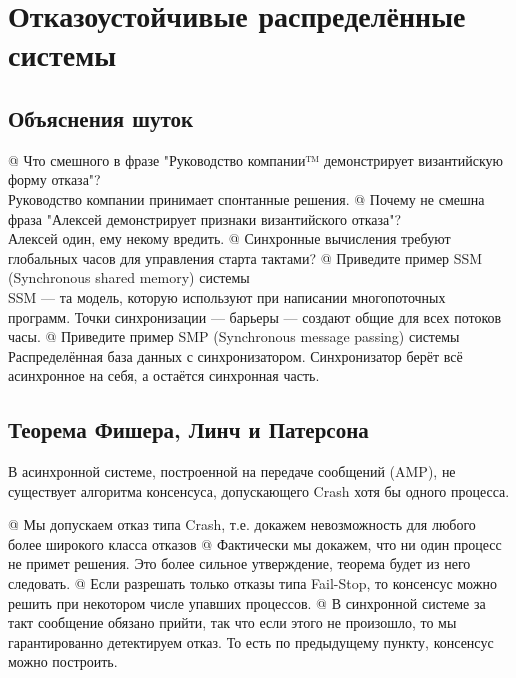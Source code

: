 \section{Отказоустойчивые распределённые системы}

\subsection{Объяснения шуток}
\begin{el}[ul]
@ Что смешного в фразе "Руководство компании™ демонстрирует византийскую форму отказа"? \\
Руководство компании принимает спонтанные решения.
@ Почему не смешна фраза "Алексей демонстрирует признаки византийского отказа"? \\
Алексей один, ему некому вредить.
@ Синхронные вычисления требуют глобальных часов для
управления старта тактами?
@ Приведите пример SSM (Synchronous shared memory) системы\\
SSM --- та модель, которую используют при написании многопоточных программ. Точки синхронизации --- барьеры --- создают общие для всех потоков часы.
@ Приведите пример SMP (Synchronous message passing) системы
Распределённая база данных с синхронизатором. Синхронизатор берёт всё асинхронное на себя, а остаётся синхронная часть.
\end{el}

\subsection{Теорема Фишера, Линч и Патерсона}
\begin{thm}
В асинхронной системе, построенной на передаче сообщений (AMP), не существует алгоритма консенсуса, допускающего Crash хотя бы одного процесса.
\end{thm}
\begin{note}
\begin{el}[ul]
@ Мы допускаем отказ типа Crash, т.е. докажем невозможность для любого более широкого класса отказов
@ Фактически мы докажем, что ни один процесс не примет решения. Это более сильное утверждение, теорема будет из него следовать.
@ Если разрешать только отказы типа Fail-Stop, то консенсус можно решить при некотором числе упавших процессов.
@ В синхронной системе за такт сообщение обязано прийти, так что если этого не произошло, то мы гарантированно детектируем отказ. То есть по предыдущему пункту, консенсус можно построить.
\end{el}
\end{note}

